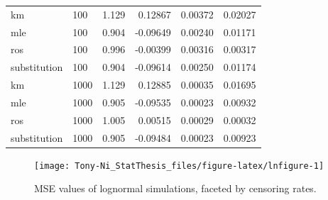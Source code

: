 \documentclass[12pt, twoside]{amherstthesis}
\begin{document}
\begin{table}
\begin{tabular}[t]{llrrrr}
\hline
\hspace{1em}km & 100 & 1.129 & 0.12867 & 0.00372 & 0.02027\\
\hspace{1em}mle & 100 & 0.904 & -0.09649 & 0.00240 & 0.01171\\
\hspace{1em}ros & 100 & 0.996 & -0.00399 & 0.00316 & 0.00317\\
\hspace{1em}substitution & 100 & 0.904 & -0.09614 & 0.00250 & 0.01174\\
\hline
\hspace{1em}km & 1000 & 1.129 & 0.12885 & 0.00035 & 0.01695\\
\hspace{1em}mle & 1000 & 0.905 & -0.09535 & 0.00023 & 0.00932\\
\hspace{1em}ros & 1000 & 1.005 & 0.00515 & 0.00029 & 0.00032\\
\hspace{1em}substitution & 1000 & 0.905 & -0.09484 & 0.00023 & 0.00923\\
\bottomrule
\end{tabular}
\end{table}
\begin{figure}

{\centering \texttt{[image: Tony-Ni\_StatThesis\_files/figure-latex/lnfigure-1]} 

}

\caption{MSE values of lognormal simulations, faceted by censoring rates.}\label{fig:lnfigure}
\end{figure}
\end{document}
